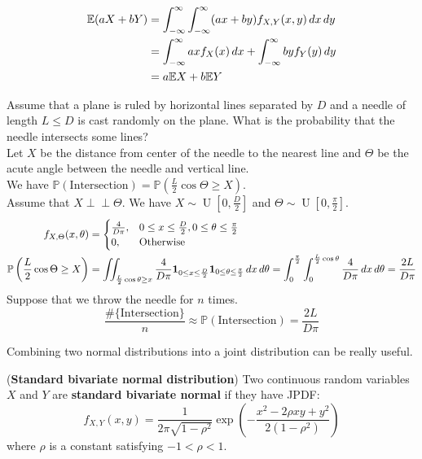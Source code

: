 \documentclass{huhtakm-template-book}
\newcommand{\independent}{\perp\!\!\!\perp}
\newcommand{\prob}{\mathbb{P}}
\newcommand{\expect}{\mathbb{E}}
\DeclareMathOperator{\U}{U}
\begin{document}
    \begin{proofing}
        \begin{align*}
            \expect(aX+bY)&=\intinfty\intinfty(ax+by)f_{X,Y}(x,y)\,dx\,dy\\
            &=\intinfty axf_{X}(x)\,dx+\intinfty byf_{Y}(y)\,dy\\
            &=a\expect X+b\expect Y
        \end{align*}
    \end{proofing}
    
    \newpage
    \begin{eg}
        Assume that a plane is ruled by horizontal lines separated by $D$ and a needle of length $L\leq D$ is cast randomly on the plane. What is the probability that the needle intersects some lines?\\
        Let $X$ be the distance from center of the needle to the nearest line and $\Theta$ be the acute angle between the needle and vertical line.\\
        We have $\prob(\text{Intersection})=\prob\left(\frac{L}{2}\cos\Theta\geq X\right)$.\\
        Assume that $X\independent\Theta$. We have $X\sim\U\left[0,\frac{D}{2}\right]$ and $\Theta\sim\U\left[0,\frac{\pi}{2}\right]$.
        \begin{align*}
            f_{X,\Theta}(x,\theta)&=\begin{cases}
                \frac{4}{D\pi}, &0\leq x\leq\frac{D}{2},0\leq\theta\leq\frac{\pi}{2}\\
                0, &\text{Otherwise}
            \end{cases}\\
            \prob\left(\frac{L}{2}\cos\Theta\geq X\right)&=\iint_{\frac{L}{2}\cos\theta\geq x}\frac{4}{D\pi}\mathbf{1}_{0\leq x\leq\frac{D}{2}}\mathbf{1}_{0\leq\theta\leq\frac{\pi}{2}}\,dx\,d\theta=\intlu{0}{\frac{\pi}{2}}\intlu{0}{\frac{L}{2}\cos\theta}\frac{4}{D\pi}\,dx\,d\theta=\frac{2L}{D\pi}
        \end{align*}
        Suppose that we throw the needle for $n$ times.
        \begin{equation*}
            \frac{\#\{\text{Intersection}\}}{n}\approx\prob(\text{Intersection})=\frac{2L}{D\pi}
        \end{equation*}
    \end{eg}
    Combining two normal distributions into a joint distribution can be really useful.
    \begin{eg}(\textbf{Standard bivariate normal distribution}) 
        Two continuous random variables $X$ and $Y$ are \textbf{standard bivariate normal} if they have JPDF:
        \begin{equation*}
            f_{X,Y}(x,y)=\frac{1}{2\pi\sqrt{1-\rho^{2}}}\exp\left(-\frac{x^{2}-2\rho xy+y^{2}}{2(1-\rho^{2})}\right)
        \end{equation*}
        where $\rho$ is a constant satisfying $-1<\rho<1$.
    \end{eg}
\end{document}
